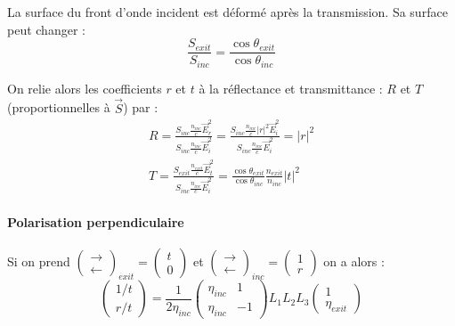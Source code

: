 \documentclass[a4paper,english]{article}
\begin{document}
La surface du front d'onde incident est déformé après la transmission. Sa surface peut changer :
\begin{equation}
	\frac{S_{exit}}{S_{inc}} = \frac{\cos \theta_{exit}}{\cos \theta_{inc}}
\end{equation}

On relie alors les coefficients $r$ et $t$ à la réflectance et transmittance : $R$ et $T$ (proportionnelles à $\vec S$) par :
\begin{align}
	R = \frac{S_{inc} \frac{n_{inc}}{c} \vec E_{r}^2}{S_{inc} \frac{n_{inc}}{c} \vec E_{i}^2} = \frac{S_{inc}\frac{n_{inc}}{c} |r|^2 \vec E_{i}^2}{S_{inc} \frac{n_{inc}}{c} \vec E_{i}^2} = |r|^2 \\
	T = \frac{S_{exit} \frac{n_{exit}}{c} \vec E_{t}^2}{S_{inc} \frac{n_{inc}}{c} \vec E_{i}^2} = \frac{\cos \theta_{exit}}{\cos \theta_{inc}} \frac{n_{exit}}{n_{inc}} |t|^2
\end{align}

\paragraph{Polarisation perpendiculaire}

Si on prend $\begin{pmatrix}\rightarrow \\ \leftarrow\end{pmatrix}_{exit} = \begin{pmatrix}t \\ 0\end{pmatrix}$ et $\begin{pmatrix}\rightarrow \\ \leftarrow\end{pmatrix}_{inc} = \begin{pmatrix}1 \\ r\end{pmatrix}$ on a alors :
\begin{dmath}
\begin{pmatrix}1/t \\ r/t \end{pmatrix} = \frac{1}{2 \eta_{inc}} \begin{pmatrix} \eta_{inc} & 1 \\ \eta_{inc} & -1 \end{pmatrix} L_1 L_2 L_3 \begin{pmatrix} 1 \\ \eta_{exit} \end{pmatrix}
\end{dmath}
\end{document}
